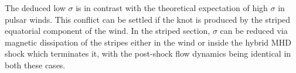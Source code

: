 The deduced low $\sigma$ is in contrast with the theoretical expectation of high $\sigma$ in pulsar winds. This conflict can be settled if the knot is produced by the striped equatorial component of the wind. In the striped section, $\sigma$ can be reduced via
magnetic dissipation of the stripes either in the wind or inside the hybrid MHD shock which terminates it, with the post-shock flow dynamics being identical in both these cases.  
